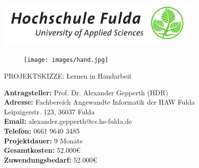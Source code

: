 \documentclass[11pt]{article}
\begin{document}
\begin{center}
{ \centering \includegraphics[width=10cm]{hsf.png} }

\vspace{-0.8cm}
\begin{figure}[h!]
\centering
\texttt{[image: images/hand.jpg]}
\end{figure}

{\Huge
PROJEKTSKIZZE: Lernen in Handarbeit
}
\\
\vspace{0.5cm}

\Large
{\bf Antragsteller:} Prof. Dr. Alexander Gepperth (HDR)\\
{\bf Adresse: } Fachbereich Angewandte Informatik der HAW Fulda\\
Leipzigerstr. 123, 36037 Fulda\\
{\bf Email: } alexander.gepperth@cs.hs-fulda.de\\
{\bf Telefon: } 0661 9640 3485\\
\vspace{0.5cm}
%
{\bf Projektdauer:} 9 Monate\\
%
{\bf Gesamtkosten:} 52.000\euro\\
%
{\bf Zuwendungsbedarf:} 52.000\euro\\
\vspace{0.5cm}

\end{center}
\newpage

\renewcommand{\thesection}{1}
\end{document}
